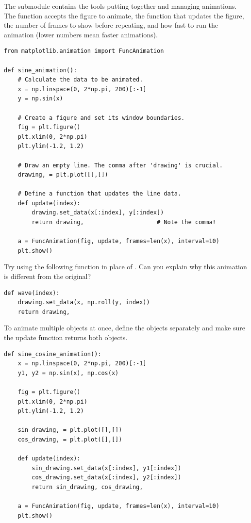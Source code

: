 The submodule  contains the tools putting together and managing animations.
The function  accepts the figure to animate, the function that updates the figure, the number of frames to show before repeating, and how fast to run the animation (lower numbers mean faster animations).

\begin{lstlisting}
from matplotlib.animation import FuncAnimation

def sine_animation():
    # Calculate the data to be animated.
    x = np.linspace(0, 2*np.pi, 200)[:-1]
    y = np.sin(x)

    # Create a figure and set its window boundaries.
    fig = plt.figure()
    plt.xlim(0, 2*np.pi)
    plt.ylim(-1.2, 1.2)

    # Draw an empty line. The comma after 'drawing' is crucial.
    drawing, = plt.plot([],[])

    # Define a function that updates the line data.
    def update(index):
        drawing.set_data(x[:index], y[:index])
        return drawing,                     # Note the comma!

    a = FuncAnimation(fig, update, frames=len(x), interval=10)
    plt.show()
\end{lstlisting}

Try using the following function in place of .
Can you explain why this animation is different from the original?

\begin{lstlisting}
def wave(index):
    drawing.set_data(x, np.roll(y, index))
    return drawing,
\end{lstlisting}

To animate multiple objects at once, define the objects separately and make sure the update function returns both objects.

\begin{lstlisting}
def sine_cosine_animation():
    x = np.linspace(0, 2*np.pi, 200)[:-1]
    y1, y2 = np.sin(x), np.cos(x)

    fig = plt.figure()
    plt.xlim(0, 2*np.pi)
    plt.ylim(-1.2, 1.2)

    sin_drawing, = plt.plot([],[])
    cos_drawing, = plt.plot([],[])

    def update(index):
        sin_drawing.set_data(x[:index], y1[:index])
        cos_drawing.set_data(x[:index], y2[:index])
        return sin_drawing, cos_drawing,

    a = FuncAnimation(fig, update, frames=len(x), interval=10)
    plt.show()
\end{lstlisting}


